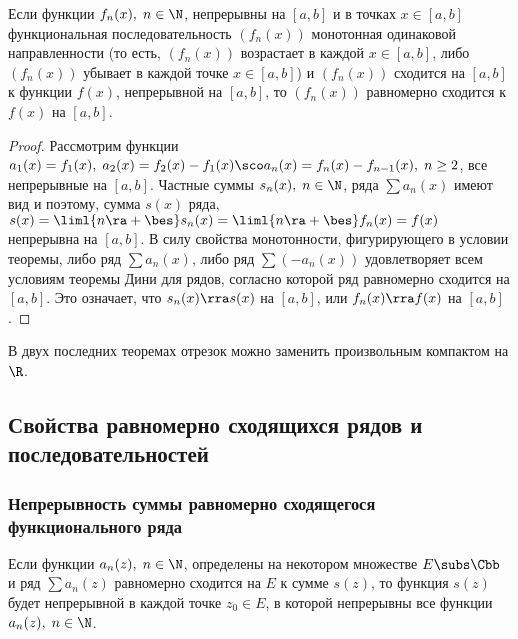 \documentclass[a4paper]{article}
\begin{document}
\begin{theorem}
Если функции $f_n(x), \; n\in\N$, непрерывны на $[a,b]$ и в точках
$x\in[a,b]$ функциональная последовательность $(f_n(x))$ монотонная
одинаковой направленности (то есть, $(f_n(x))$ возрастает в каждой
$x\in[a,b]$, либо $(f_n(x))$ убывает в каждой точке $x\in[a,b]$) и
$(f_n(x))$ сходится на $[a,b]$ к функции $f(x)$, непрерывной на
$[a,b]$, то $(f_n(x))$ равномерно сходится к $f(x)$ на $[a,b]$.
\end{theorem}

\begin{proof}
Рассмотрим функции $a_1(x) = f_1(x), \; a_2(x) = f_2(x) - f_1(x)
\sco a_n(x) = f_n(x) - f_{n-1}(x), \; n\ge2$, все непрерывные на
$[a,b]$. Частные суммы $s_n(x), \; n\in\N$, ряда $\sum a_n(x)$ имеют
вид 
и поэтому, сумма $s(x)$ ряда, $s(x) = \liml{n\ra+\bes}s_n(x) =
\liml{n\ra+\bes} f_n(x) = f(x)$ непрерывна на $[a,b]$. В силу
свойства монотонности, фигурирующего в условии теоремы, либо ряд
$\sum a_n(x)$, либо ряд $\sum(-a_n(x))$ удовлетворяет всем условиям
теоремы Дини для рядов, согласно которой ряд равномерно сходится на
$[a,b]$. Это означает, что $s_n(x) \rra s(x)$ на $[a,b]$, или
$f_n(x)\rra f(x)$ на $[a,b]$.
\end{proof}

\begin{note}
В двух последних теоремах отрезок можно заменить произвольным
компактом на $\R$.
\end{note}

\subsection{Свойства равномерно сходящихся рядов и
последовательностей}

\subsubsection{Непрерывность суммы равномерно сходящегося
функционального ряда}

\begin{theorem}
Если функции $a_n(z), \; n\in\N$, определены на некотором множестве
$E\subs\Cbb$ и ряд $\sum a_n(z)$ равномерно сходится на $E$ к сумме
$s(z)$, то функция $s(z)$ будет непрерывной в каждой точке $z_0\in
E$, в которой непрерывны все функции $a_n(z), \; n\in\N$.
\end{theorem}
\end{document}
